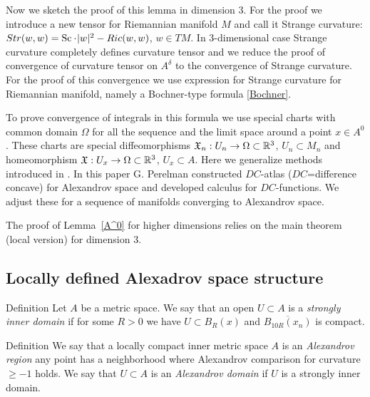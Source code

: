  

  Now we sketch the proof of this lemma in dimension 3. 
 For the proof
 we introduce 
 a new tensor 
 for Riemannian manifold $M$ and call it
 Strange curvature:  $Str(w,w)=\Sc\cdot |w|^2-Ric(w,w)$, $w\in TM$.
 In 3-dimensional case
 Strange curvature
  completely defines curvature tensor
  and we reduce the proof of convergence of curvature tensor
  on $A^\delta$ to the convergence of Strange curvature.
 For the proof of this convergence we use 
 expression for Strange curvature for Riemannian 
 manifold,
namely
 a Bochner-type formula \ref{Bochner}.

To prove convergence of
integrals in this
 formula  we use
special charts with common domain $\Omega$ for all the sequence and the limit space
 around a  point $x\in A^0$.
These charts are special
diffeomorphisms
$\mathfrak X_n:U_n\to\Omega\subset\mathbb{R}^3$, $U_n\subset M_n$ and
homeomorphism
$\mathfrak X:U_x\to\Omega\subset\mathbb{R}^3$, $U_x\subset A$.
Here we  generalize methods introduced in
\cite{PerDC}.  In  this paper G. Perelman 
constructed $DC$-atlas ($DC$=difference concave)
for Alexandrov space and developed calculus for
$DC$-functions. We adjust these for a sequence
of manifolds converging to Alexandrov space.



 
The proof of Lemma~\ref{A^0} for higher dimensions
relies on the main theorem (local version) for dimension 3.



\subsection{Locally defined Alexadrov space structure }

\begin{rdef}{Definition}
Let $A$ be a metric space. 
We say that an open  $U\subset A$
is a \emph{strongly inner domain} if
for some 
$R>0$ we have
$U\subset B_R(x)$
and $\overline{B_{10R}(x_n)}$ is compact.

\end{rdef}

\begin{rdef}{Definition}
We say that
 a locally compact inner metric space $A$
is an \emph{ Alexandrov region}
any point has a neighborhood where Alexandrov
comparison for curvature $\ge -1$ holds.
We say that $U\subset A$
is an \emph{ Alexandrov domain}
 if $U$ is 
 a strongly inner domain.

\end{rdef}


